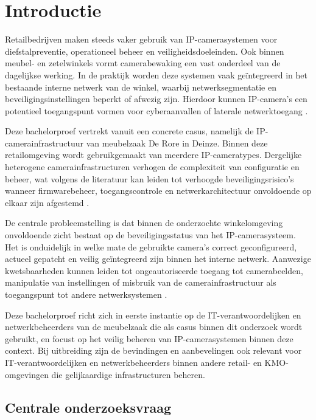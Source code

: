 \section{Introductie}

Retailbedrijven maken steeds vaker gebruik van IP-camerasystemen voor diefstalpreventie, operationeel beheer en veiligheidsdoeleinden. Ook binnen meubel- en zetelwinkels vormt camerabewaking een vast onderdeel van de dagelijkse werking. In de praktijk worden deze systemen vaak geïntegreerd in het bestaande interne netwerk van de winkel, waarbij netwerksegmentatie en beveiligingsinstellingen beperkt of afwezig zijn. Hierdoor kunnen IP-camera’s een potentieel toegangspunt vormen voor cyberaanvallen of laterale netwerktoegang \parencite{ENISA2024ThreatLandscape, Naprys2024Dahua}.

Deze bachelorproef vertrekt vanuit een concrete casus, namelijk de IP-camerainfrastructuur van meubelzaak De Rore in Deinze. Binnen deze retailomgeving wordt gebruikgemaakt van meerdere IP-cameratypes. Dergelijke heterogene camerainfrastructuren verhogen de complexiteit van configuratie en beheer, wat volgens de literatuur kan leiden tot verhoogde beveiligingsrisico’s wanneer firmwarebeheer, toegangscontrole en netwerkarchitectuur onvoldoende op elkaar zijn afgestemd \parencite{Butun2019arXivIoTSecurity}.

De centrale probleemstelling is dat binnen de onderzochte winkelomgeving onvoldoende zicht bestaat op de beveiligingsstatus van het \newline IP-camerasysteem. Het is onduidelijk in welke mate de gebruikte camera’s correct geconfigureerd, actueel gepatcht en veilig geïntegreerd zijn binnen het interne netwerk. Aanwezige kwetsbaarheden kunnen leiden tot ongeautoriseerde toegang tot camerabeelden, manipulatie van instellingen of misbruik van de camerainfrastructuur als toegangspunt tot andere netwerksystemen \parencite{Butun2019arXivIoTSecurity}.

Deze bachelorproef richt zich in eerste instantie op de IT-verantwoordelijken en netwerkbeheerders van de meubelzaak die als casus binnen dit onderzoek wordt gebruikt, en focust op het veilig beheren van IP-camerasystemen binnen deze context. Bij uitbreiding zijn de bevindingen en aanbevelingen ook relevant voor \newline IT-verantwoordelijken en netwerkbeheerders binnen andere retail- en KMO-omgevingen die gelijkaardige infrastructuren beheren.

\subsection*{Centrale onderzoeksvraag}

